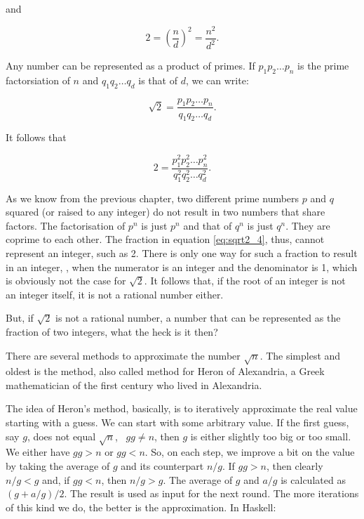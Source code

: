 \documentclass[tikz]{scrreprt}
\begin{document}
and

\begin{equation}
2 = \left(\frac{n}{d}\right)^2 = \frac{n^2}{d^2}.
\end{equation}

Any number can be represented as a product of primes.
If $p_1p_2\dots p_n$ is the prime factorsiation of $n$
and $q_1q_2\dots q_d$ is that of $d$,
we can write:

\begin{equation}
\sqrt{2} = \frac{p_1p_2\dots p_n}{q_1q_2\dots q_d}.
\end{equation}

It follows that 

\begin{equation}\label{eq:sqrt2_4}
2 = \frac{p_1^2p_2^2\dots p_n^2}{q_1^2q_2^2\dots q_d^2}.
\end{equation}

As we know from the previous chapter,
two different prime numbers $p$ and $q$ squared 
(or raised to any integer)
do not result in two numbers that share factors.
The factorisation of $p^n$ is just $p^n$ and that
of $q^n$ is just $q^n$. They are coprime to each other.
The fraction in equation \ref{eq:sqrt2_4}, thus,
cannot represent an integer, such as 2.
There is only one way for such a fraction to
result in an integer, \viz, 
when the numerator is an integer and the denominator is 1,
which is obviously not the case for $\sqrt{2}$.
It follows that, if the root of an integer is not an integer itself,
it is not a rational number either.

But, if $\sqrt{2}$ is not a rational number,
a number that can be represented as the fraction
of two integers, what the heck is it then?

There are several methods to approximate the number $\sqrt{n}$.
The simplest and oldest is the  method,
also called  method for Heron of Alexandria,
a Greek mathematician of the first century who lived in 
Alexandria.

The idea of Heron's method, basically, is to
iteratively approximate the real value starting with a guess.
We can start with some arbitrary value.
If the first guess, say $g$, does not equal $\sqrt{n}$, 
\ie\ $gg \neq n$, then $g$
is either slightly too big or too small.
We either have $gg > n$ or $gg < n$.
So, on each step, we improve a bit on the value
by taking the average of $g$ and its counterpart $n/g$.
If $gg > n$, then clearly $n/g < g$ and, 
if $gg < n$, then $n/g > g$.
The average of $g$ and $a/g$ is calculated as
$(g+a/g)/2$. The result is used as input for the next round.
The more iterations of this kind we do,
the better is the approximation. In Haskell:
\end{document}
